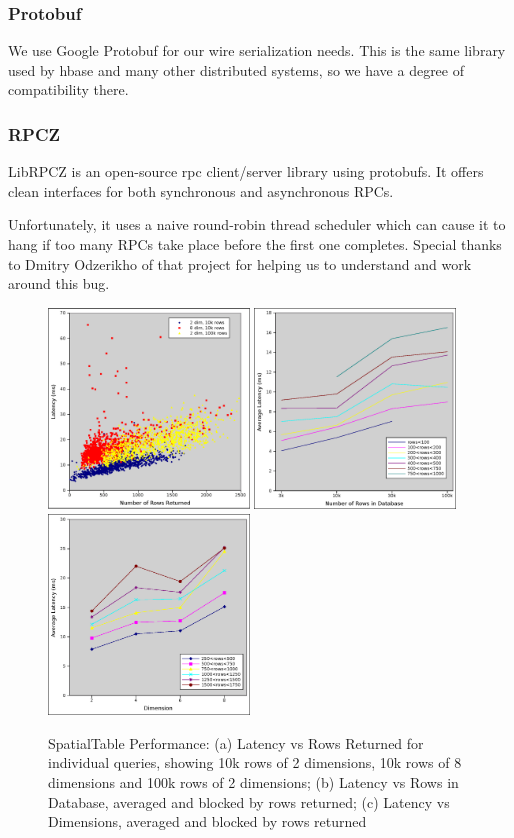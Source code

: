 \documentclass[11pt]{article}
\begin{document}
\subsubsection{Protobuf}

We use Google Protobuf\cite{protobuf} for our wire serialization needs. This is the same library used by hbase and many other distributed systems, so we have a degree of compatibility there.

\subsubsection{RPCZ}

LibRPCZ\cite{rpcz} is an open-source rpc client/server library using protobufs. It offers clean interfaces for both synchronous and asynchronous RPCs.

Unfortunately, it uses a naive round-robin thread scheduler which can cause it to hang if too many RPCs take place before the first one completes. Special thanks to Dmitry Odzerikho of that project for helping us to understand and work around this bug.

\begin{figure}[t]
\includegraphics[width=2.1in]{stres}
\includegraphics[width=2.1in]{nrowseff}
\includegraphics[width=2.1in]{dimeff}
\caption{SpatialTable Performance: (a) Latency vs Rows Returned for individual queries, showing 10k rows of 2 dimensions, 10k rows of 8 dimensions and 100k rows of 2 dimensions; (b) Latency vs Rows in Database, averaged and blocked by rows returned; (c) Latency vs Dimensions, averaged and blocked by rows returned }
\label{fig:res}
\end{figure}
\end{document}
